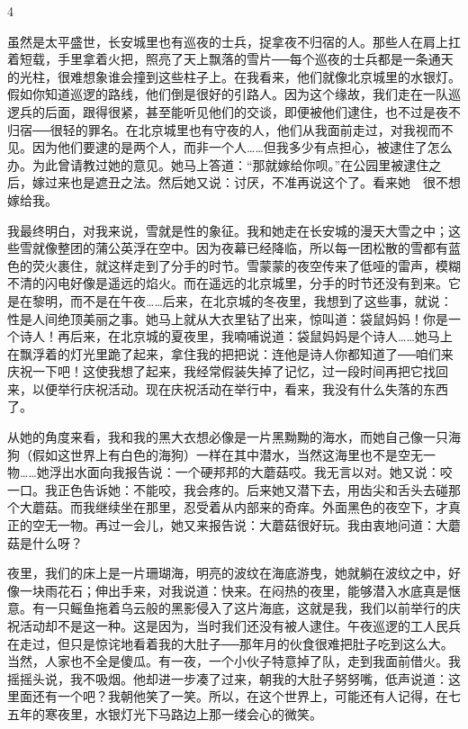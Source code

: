 4 

虽然是太平盛世，长安城里也有巡夜的士兵，捉拿夜不归宿的人。那些人在肩上扛着短载，手里拿着火把，照亮了天上飘落的雪片──每个巡夜的士兵都是一条通天的光柱，很难想象谁会撞到这些柱子上。在我看来，他们就像北京城里的水银灯。假如你知道巡逻的路线，他们倒是很好的引路人。因为这个缘故，我们走在一队巡逻兵的后面，跟得很紧，甚至能听见他们的交谈，即便被他们逮住，也不过是夜不归宿──很轻的罪名。在北京城里也有守夜的人，他们从我面前走过，对我视而不见。因为他们要逮的是两个人，而非一个人……但我多少有点担心，被逮住了怎么办。为此曾请教过她的意见。她马上答道：“那就嫁给你呗。”在公园里被逮住之后，嫁过来也是遮丑之法。然后她又说：讨厌，不准再说这个了。看来她　很不想嫁给我。 

我最终明白，对我来说，雪就是性的象征。我和她走在长安城的漫天大雪之中；这些雪就像整团的蒲公英浮在空中。因为夜幕已经降临，所以每一团松散的雪都有蓝色的荧火裹住，就这样走到了分手的时节。雪蒙蒙的夜空传来了低哑的雷声，模糊不清的闪电好像是遥远的焰火。而在遥远的北京城里，分手的时节还没有到来。它是在黎明，而不是在午夜……后来，在北京城的冬夜里，我想到了这些事，就说：性是人间绝顶美丽之事。她马上就从大衣里钻了出来，惊叫道：袋鼠妈妈！你是一个诗人！再后来，在北京城的夏夜里，我喃哺说道：袋鼠妈妈是个诗人……她马上在飘浮着的灯光里跪了起来，拿住我的把把说：连他是诗人你都知道了──咱们来庆祝一下吧！这使我想了起来，我经常假装失掉了记忆，过一段时间再把它找回来，以便举行庆祝活动。现在庆祝活动在举行中，看来，我没有什么失落的东西了。 

从她的角度来看，我和我的黑大衣想必像是一片黑黝黝的海水，而她自己像一只海狗（假如这世界上有白色的海狗）一样在其中潜水，当然这海里也不是空无一物……她浮出水面向我报告说：一个硬邦邦的大蘑菇哎。我无言以对。她又说：咬一口。我正色告诉她：不能咬，我会疼的。后来她又潜下去，用齿尖和舌头去碰那个大蘑菇。而我继续坐在那里，忍受着从内部来的奇痒。外面黑色的夜空下，才真正的空无一物。再过一会儿，她又来报告说：大蘑菇很好玩。我由衷地问道：大蘑菇是什么呀？ 

夜里，我们的床上是一片珊瑚海，明亮的波纹在海底游曳，她就躺在波纹之中，好像一块雨花石；伸出手来，对我说道：快来。在闷热的夜里，能够潜入水底真是惬意。有一只鳐鱼拖着乌云般的黑影侵入了这片海底，这就是我，我们以前举行的庆祝活动却不是这一种。这是因为，当时我们还没有被人逮住。午夜巡逻的工人民兵在走过，但只是惊诧地看着我的大肚子──那年月的伙食很难把肚子吃到这么大。当然，人家也不全是傻瓜。有一夜，一个小伙子特意掉了队，走到我面前借火。我摇摇头说，我不吸烟。他却进一步凑了过来，朝我的大肚子努努嘴，低声说道：这里面还有一个吧？我朝他笑了一笑。所以，在这个世界上，可能还有人记得，在七五年的寒夜里，水银灯光下马路边上那一缕会心的微笑。 

